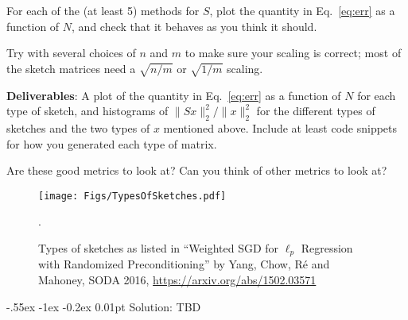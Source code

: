 \documentclass[10pt, letterpaper]{scrartcl}
\makeatletter
\newlength{\savedparindent}
\newcommand\solParagraph{\@startsection{paragraph}{4}{\z@}%
    {-.55ex \@plus -1ex \@minus -0.2ex}%
    {0.01pt}%
    {\raggedsection\normalfont\sectfont\nobreak\size@paragraph}%
}
\newenvironment{solution}{\setlength{\parindent}{\savedparindent}\solParagraph{Solution:}}{}
\makeatother
\begin{document}
\begin{enumerate}[align=left, leftmargin=*, label=\sffamily\bfseries Problem \arabic*:]
    For each of the (at least 5) methods for $S$, plot the quantity in Eq.~\eqref{eq:err} as a function of $N$, and check that it behaves as you think it should. 
    
    Try with several choices of $n$ and $m$ to make sure your scaling is correct; most of the sketch matrices need a $\sqrt{n/m}$ or $\sqrt{1/m}$ scaling.
    
    \textbf{Deliverables}: A plot of the quantity in Eq.~\eqref{eq:err} as a function of $N$ for each type of sketch, and histograms of $\|Sx\|_2^2/\|x\|_2^2$ for the different types of sketches and the two types of $x$ mentioned above. Include at least code snippets for how you generated each type of matrix.
    
    Are these good metrics to look at? Can you think of other metrics to look at?
    
\begin{figure}
    \centering
    \texttt{[image: Figs/TypesOfSketches.pdf]}
    \caption{Types of sketches as listed in 
        ``Weighted SGD for $\ell_p$ Regression with Randomized Preconditioning'' by Yang, Chow, R\'e and Mahoney, SODA 2016, \url{https://arxiv.org/abs/1502.03571}}.
\label{fig:1}
\end{figure}
    
    
\begin{solution}
TBD
%

\end{solution}



\end{enumerate}   
\end{document}
